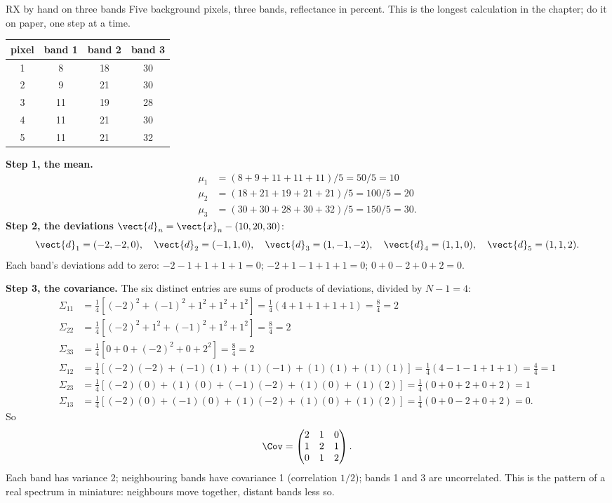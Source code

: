 \begin{worked}[label={we:rx:three}]{RX by hand on three bands}
Five background pixels, three bands, reflectance in percent. This is the longest calculation in the
chapter; do it on paper, one step at a time.
\begin{center}
\begin{tabular}{cccc}
\toprule
pixel & band 1 & band 2 & band 3\\
\midrule
1 & 8  & 18 & 30\\
2 & 9  & 21 & 30\\
3 & 11 & 19 & 28\\
4 & 11 & 21 & 30\\
5 & 11 & 21 & 32\\
\bottomrule
\end{tabular}
\end{center}
\textbf{Step 1, the mean.}
\begin{align*}
\mu_1 &= (8 + 9 + 11 + 11 + 11)/5 = 50/5 = 10\\
\mu_2 &= (18 + 21 + 19 + 21 + 21)/5 = 100/5 = 20\\
\mu_3 &= (30 + 30 + 28 + 30 + 32)/5 = 150/5 = 30 .
\end{align*}
\textbf{Step 2, the deviations} $\vect{d}_n = \vect{x}_n - (10, 20, 30)$:
\[
\vect{d}_1 = (-2, -2, 0),\quad \vect{d}_2 = (-1, 1, 0),\quad \vect{d}_3 = (1, -1, -2),\quad
\vect{d}_4 = (1, 1, 0),\quad \vect{d}_5 = (1, 1, 2).
\]
Each band's deviations add to zero: $-2 - 1 + 1 + 1 + 1 = 0$; $-2 + 1 - 1 + 1 + 1 = 0$;
$0 + 0 - 2 + 0 + 2 = 0$.

\textbf{Step 3, the covariance.} The six distinct entries are sums of products of deviations,
divided by $N - 1 = 4$:
\begin{align*}
\Sigma_{11} &= \tfrac14\left[(-2)^2 + (-1)^2 + 1^2 + 1^2 + 1^2\right] = \tfrac14(4 + 1 + 1 + 1 + 1)
  = \tfrac84 = 2\\
\Sigma_{22} &= \tfrac14\left[(-2)^2 + 1^2 + (-1)^2 + 1^2 + 1^2\right] = \tfrac84 = 2\\
\Sigma_{33} &= \tfrac14\left[0 + 0 + (-2)^2 + 0 + 2^2\right] = \tfrac84 = 2\\
\Sigma_{12} &= \tfrac14\left[(-2)(-2) + (-1)(1) + (1)(-1) + (1)(1) + (1)(1)\right]
  = \tfrac14(4 - 1 - 1 + 1 + 1) = \tfrac44 = 1\\
\Sigma_{23} &= \tfrac14\left[(-2)(0) + (1)(0) + (-1)(-2) + (1)(0) + (1)(2)\right]
  = \tfrac14(0 + 0 + 2 + 0 + 2) = 1\\
\Sigma_{13} &= \tfrac14\left[(-2)(0) + (-1)(0) + (1)(-2) + (1)(0) + (1)(2)\right]
  = \tfrac14(0 + 0 - 2 + 0 + 2) = 0 .
\end{align*}
So
\[
\Cov = \begin{pmatrix} 2 & 1 & 0\\ 1 & 2 & 1\\ 0 & 1 & 2\end{pmatrix}.
\]
Each band has variance 2; neighbouring bands have covariance 1 (correlation $1/2$); bands 1 and 3
are uncorrelated. This is the pattern of a real spectrum in miniature: neighbours move together,
distant bands less so.


\end{worked}
